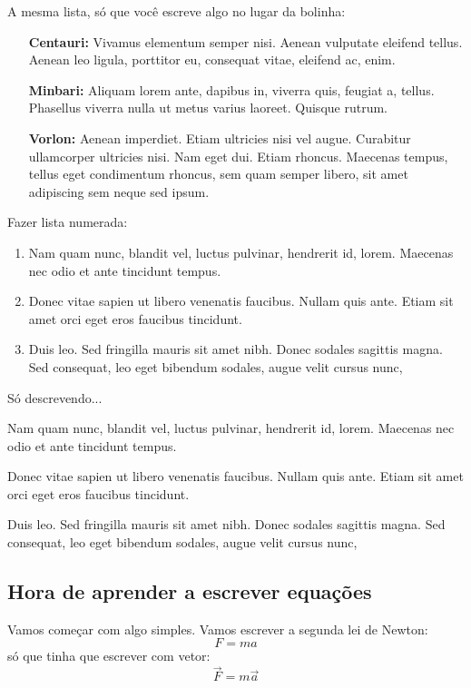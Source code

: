 \documentclass[pdftex,12pt,a4paper]{article} %
\begin{document}
A mesma lista, só que você escreve algo no lugar da bolinha:
\begin{itemize}
  \item[\bf Centauri:] Vivamus elementum semper nisi. Aenean vulputate eleifend
tellus. Aenean leo ligula, porttitor eu, consequat vitae, eleifend ac,
enim.
\item[\bf Minbari:] Aliquam lorem ante, dapibus in, viverra quis, feugiat a,
tellus. Phasellus viverra nulla ut metus varius laoreet. Quisque
rutrum.
\item[\bf Vorlon:] Aenean imperdiet. Etiam ultricies nisi vel augue. Curabitur
ullamcorper ultricies nisi. Nam eget dui. Etiam rhoncus. Maecenas
tempus, tellus eget condimentum rhoncus, sem quam semper libero, sit
amet adipiscing sem neque sed ipsum.
\end{itemize}
Fazer lista numerada: 
\begin{enumerate}
 \item Nam quam nunc, blandit vel,
luctus pulvinar, hendrerit id, lorem. Maecenas nec odio et ante
tincidunt tempus.
\item Donec vitae sapien ut libero venenatis
faucibus. Nullam quis ante. Etiam sit amet orci eget eros faucibus
tincidunt.
\item Duis leo. Sed fringilla mauris sit amet nibh. Donec sodales
sagittis magna. Sed consequat, leo eget bibendum sodales, augue velit
cursus nunc,
\end{enumerate}

Só descrevendo...
\begin{description}
   \item Nam quam nunc, blandit vel,
luctus pulvinar, hendrerit id, lorem. Maecenas nec odio et ante
tincidunt tempus.
\item Donec vitae sapien ut libero venenatis
faucibus. Nullam quis ante. Etiam sit amet orci eget eros faucibus
tincidunt.
\item Duis leo. Sed fringilla mauris sit amet nibh. Donec sodales
sagittis magna. Sed consequat, leo eget bibendum sodales, augue velit
cursus nunc,
\end{description}


\subsection{Hora de aprender a escrever equações}

Vamos começar com algo simples. Vamos escrever a segunda lei de Newton:
\begin{equation}
  F = ma
  \label{newton1}
\end{equation}
só que tinha que escrever com vetor:
\begin{equation}
  \vec{F} = m \vec{a} 
  \label{newton2}
\end{equation}
\end{document}
